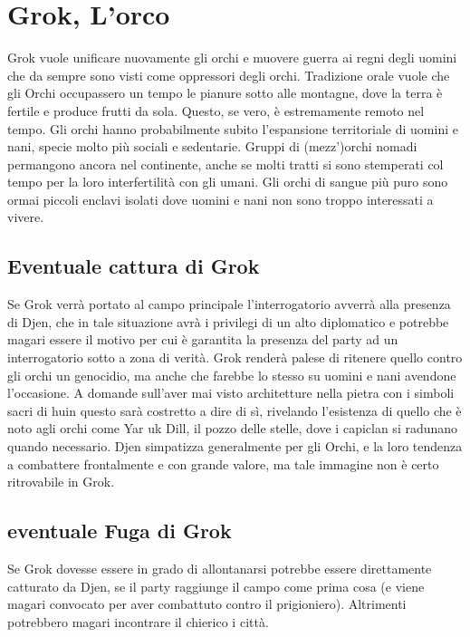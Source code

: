 \documentclass[10pt,twoside, twocolumn, openany]{dndbook}
\begin{document}
\section{Grok, L'orco}
Grok vuole unificare nuovamente gli orchi e muovere guerra ai regni degli uomini che da sempre sono visti come oppressori degli orchi. Tradizione orale vuole che gli Orchi occupassero un tempo le pianure sotto alle montagne, dove la terra è fertile e produce frutti da sola.
Questo, se vero, è estremamente remoto nel tempo. Gli orchi hanno probabilmente subito l'espansione territoriale di uomini e nani, specie molto più sociali e sedentarie. Gruppi di (mezz')orchi nomadi permangono ancora nel continente, anche se molti tratti si sono stemperati col tempo per la loro interfertilità con gli umani.
Gli orchi di sangue più puro sono ormai piccoli enclavi isolati dove uomini e nani non sono troppo interessati a vivere. 

\subsection*{Eventuale cattura di Grok}
Se Grok verrà portato al campo principale l'interrogatorio avverrà alla presenza di Djen, che in tale situazione avrà i privilegi di un alto diplomatico e potrebbe magari essere il motivo per cui è garantita la presenza del party ad un interrogatorio sotto a zona di verità.
Grok renderà palese di ritenere quello contro gli orchi un genocidio, ma anche che farebbe lo stesso su uomini e nani avendone l'occasione. A domande sull'aver mai visto architetture nella pietra con i simboli sacri di huin questo sarà costretto a dire di sì, rivelando l'esistenza di quello che è noto agli orchi come Yar uk Dill, il pozzo delle stelle, dove i capiclan si radunano quando necessario.
Djen simpatizza generalmente per gli Orchi, e la loro tendenza a combattere frontalmente e con grande valore, ma tale immagine non è certo ritrovabile in Grok.

\subsection*{eventuale Fuga di Grok}
Se Grok dovesse essere in grado di allontanarsi potrebbe essere direttamente catturato da Djen, se il party raggiunge il campo come prima cosa (e viene magari convocato per aver combattuto contro il prigioniero). Altrimenti potrebbero magari incontrare il chierico i città.
\end{document}
